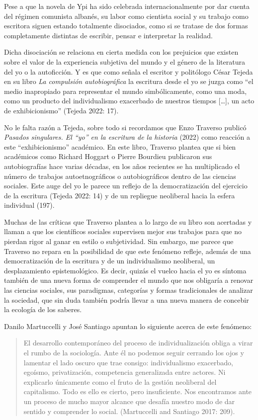 \documentclass[
]{interact}
\begin{document}
Pese a que la novela de Ypi ha sido celebrada internacionalmente por dar
cuenta del régimen comunista albanés, su labor como cientista social y
su trabajo como escritora siguen estando totalmente disociados, como si
se tratase de dos formas completamente distintas de escribir, pensar e
interpretar la realidad.

Dicha disociación se relaciona en cierta medida con los prejuicios que
existen sobre el valor de la experiencia subjetiva del mundo y el género
de la literatura del yo o la autoficción. Y es que como señala el
escritor y politólogo César Tejeda en su libro \emph{La compulsión
autobiográfica} la escritura desde el yo se juzga como ``el medio
inapropiado para representar el mundo simbólicamente, como una moda,
como un producto del individualismo exacerbado de nuestros tiempos
{[}\ldots{]}, un acto de exhibicionismo'' (Tejeda 2022: 17).

No le falta razón a Tejeda, sobre todo si recordamos que Enzo Traverso
publicó \emph{Pasados singulares. El ``yo'' en la escritura de la
historia} (2022) como reacción a este ``exhibicionismo'' académico. En
este libro, Traverso plantea que si bien académicos como Richard Hoggart
o Pierre Bourdieu publicaron sus autobiografías hace varias décadas, en
los años recientes se ha multiplicado el número de trabajos
autoetnográficos o autobiográficos dentro de las ciencias sociales. Este
auge del yo le parece un reflejo de la democratización del ejercicio de
la escritura (Tejeda 2022: 14) y de un repliegue neoliberal hacia la
esfera individual (197).

Muchas de las críticas que Traverso plantea a lo largo de su libro son
acertadas y llaman a que los científicos sociales supervisen mejor sus
trabajos para que no pierdan rigor al ganar en estilo o subjetividad.
Sin embargo, me parece que Traverso no repara en la posibilidad de que
este fenómeno refleje, además de una democratización de la escritura y
de un individualismo neoliberal, un desplazamiento epistemológico. Es
decir, quizás el vuelco hacia el yo es síntoma también de una nueva
forma de comprender el mundo que nos obligaría a renovar las ciencias
sociales, sus paradigmas, categorías y formas tradicionales de analizar
la sociedad, que sin duda también podría llevar a una nueva manera de
concebir la ecología de los saberes.

Danilo Martuccelli y José Santiago apuntan lo siguiente acerca de este
fenómeno:

\begin{quote}
El desarrollo contemporáneo del proceso de individualización obliga a
virar el rumbo de la sociología. Ante él no podemos seguir cerrando los
ojos y lamentar el lado oscuro que trae consigo: individualismo
exacerbado, egoísmo, privatización, competencia generalizada entre
actores. Ni explicarlo únicamente como el fruto de la gestión neoliberal
del capitalismo. Todo es ello es cierto, pero insuficiente. Nos
encontramos ante un proceso de mucho mayor alcance que desafía nuestro
modo de dar sentido y comprender lo social. (Martuccelli and Santiago
2017: 209).
\end{quote}
\end{document}
